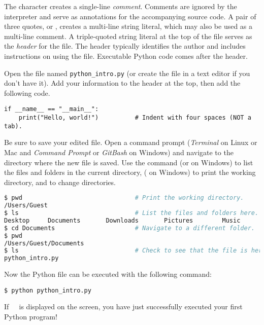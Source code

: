The \li{#} character creates a single-line \emph{comment}.
Comments are ignored by the interpreter and serve as annotations for the accompanying source code.
A pair of three quotes,  or , creates a multi-line string literal, which may also be used as a multi-line comment.
A triple-quoted string literal at the top of the file serves as the \emph{header} for the file.
The header typically identifies the author and includes instructions on using the file.
Executable Python code comes after the header.

\begin{problem} %
Open the file named \texttt{python\_intro.py} (or create the file in a text editor if you don't have it).
Add your information to the header at the top, then add the following code.

\begin{lstlisting}
if __name__ == "__main__":
    print("Hello, world!")          # Indent with four spaces (NOT a tab).
\end{lstlisting}

Be sure to save your edited file. Open a command prompt (\emph{Terminal} on Linux or Mac and \emph{Command Prompt} or \emph{GitBash} on Windows) and navigate to the directory where the new file is saved.
Use the command  (or  on Windows) to list the files and folders in the current directory,  ( on Windows) to print the working directory, and  to change directories.

\begin{lstlisting}[language=bash]
$ pwd                               # Print the working directory.
/Users/Guest
$ ls                                # List the files and folders here.
Desktop     Documents       Downloads       Pictures        Music
$ cd Documents                      # Navigate to a different folder.
$ pwd
/Users/Guest/Documents
$ ls                                # Check to see that the file is here.
python_intro.py
\end{lstlisting}

Now the Python file can be executed with the following command:

\begin{lstlisting}
$ python python_intro.py
\end{lstlisting}

If $\ $  $\ $ is displayed on the screen, you have just successfully executed your first Python program!
\label{prob:helloWorld}
\end{problem}

